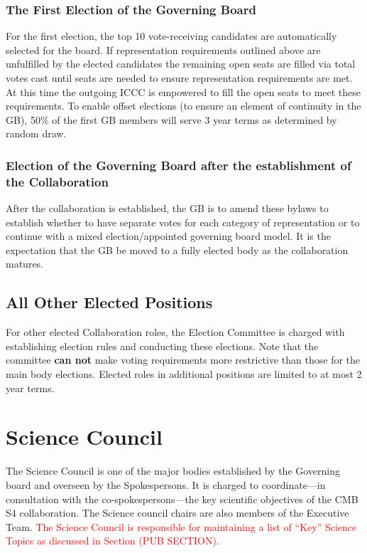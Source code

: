 \documentclass[12pt]{article}
\newcommand{\exec}{{Executive Team}}
\begin{document}
\subsubsection{The First Election of the Governing Board}
For the first election, the top 10  vote-receiving candidates are automatically selected for the board. If representation requirements outlined above are unfulfilled by the elected candidates the remaining open seats are filled via total votes cast until seats are needed to ensure representation requirements are met. At this time the outgoing ICCC is empowered to fill the open seats to meet these requirements. 
To enable offset elections (to ensure an element of continuity in the GB), 50\% of the first GB members will serve 3 year terms as determined by random draw. 

\subsubsection{Election of the Governing Board after the establishment of the Collaboration}
 After the collaboration is established, the GB is to amend these bylaws to establish whether to have separate votes for each category of representation or to continue with a mixed election/appointed governing board model. It is the expectation that the GB be moved to a fully elected body as the collaboration matures. 

\subsection{All Other Elected Positions}
For other elected Collaboration roles, the Election Committee is charged with establishing election rules and conducting these elections. Note that the committee \textbf{can not} make voting requirements more restrictive than those for the main body elections. Elected  roles in additional positions are limited to at most 2 year terms. 


\section{Science Council}

The Science Council is one of the major bodies established by the Governing board and overseen by the Spokespersons. It is charged to coordinate---in consultation with the co-spokespersons---the key scientific objectives of the CMB S4 collaboration. The Science council chairs are also members of the \exec. \textcolor{red}{The Science Council is responsible for maintaining a list of ``Key'' Science Topics as discussed in Section (PUB SECTION)}. 
\end{document}
